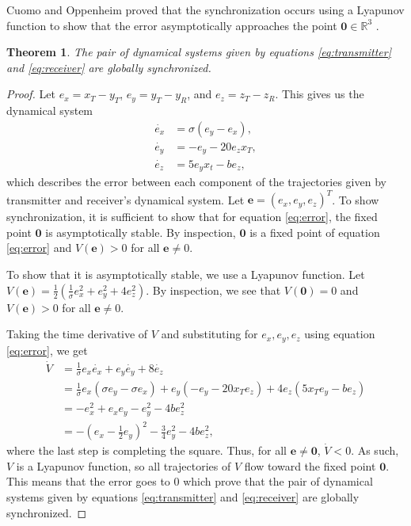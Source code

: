 \documentclass[12pt]{article}
\newtheorem{theorem}{Theorem}[section]
\begin{document}
    Cuomo and Oppenheim proved that the synchronization occurs using a Lyapunov function to show that the error asymptotically approaches the point $\mathbf{0} \in \mathbb{R}^3$ \cite{cuomo1993}. 
      \begin{theorem}\label{thm:synchronize}
        The pair of dynamical systems given by equations \ref{eq:transmitter} and \ref{eq:receiver} are globally synchronized. 
      \end{theorem}
      \begin{proof} 
       Let $e_x = x_T - y_T$, $e_y = y_T - y_R$, and $e_z = z_T - z_R$. This gives us the dynamical system 
       \begin{equation}\label{eq:error}
        \begin{aligned}
         \dot{e_x} &= \sigma (e_y - e_x), \\ 
         \dot{e_y} &= -e_y - 20e_z x_T, \\
         \dot{e_z} &= 5e_y x_t - be_z,  
        \end{aligned} 
       \end{equation}
       which describes the error between each component of the trajectories given by transmitter and receiver's dynamical system. Let $\mathbf{e} = (e_x,e_y,e_z)^T$. To show synchronization, it is sufficient to show that for equation \ref{eq:error}, the fixed point $\mathbf{0}$ is asymptotically stable. By inspection, $\mathbf{0}$ is a fixed point of equation \ref{eq:error} and $V(\mathbf{e}) > 0$ for all $\mathbf{e} \neq 0$. 
       
       To show that it is asymptotically stable, we use a Lyapunov function. Let $V(\mathbf{e}) = \frac{1}{2} \left( \frac{1}{\sigma} e_x^2 + e_y^2 + 4e_z^2 \right)$. By inspection, we see that $V(\mathbf{0}) = 0$ and $V(\mathbf{e}) > 0$ for all $\mathbf{e} \neq 0$. 
       
       Taking the time derivative of $V$ and substituting for $e_x,e_y,e_z$ using equation \ref{eq:error}, we get 
       \begin{align*} 
         \dot{V} &= \frac{1}{\sigma} e_x \dot{e_x} + e_y \dot{e_y} + 8 \dot{e_z} \\
         &= \frac{1}{\sigma} e_x (\sigma e_y - \sigma e_x) + e_y (-e_y - 20x_T e_z) + 4 e_z (5x_T e_y - be_z) \\ 
         &= -e_x^2 + e_x e_y - e_y^2 - 4be_z^2 \\
         &= - \left( e_x - \frac{1}{2}e_y \right)^2 - \frac{3}{4} e_y^2 - 4be_z^2,
       \end{align*}
       where the last step is completing the square. Thus, for all $\mathbf{e} \neq \mathbf{0}$, $\dot{V} < 0$. As such, $V$ is a Lyapunov function, so all trajectories of $V$ flow toward the fixed point $\mathbf{0}$. This means that the error goes to $0$ which prove that the pair of dynamical systems given by equations \ref{eq:transmitter} and \ref{eq:receiver} are globally synchronized.
      \end{proof}
\end{document}

